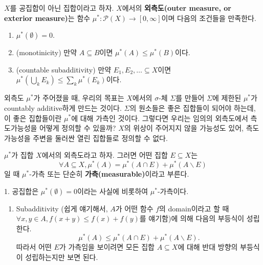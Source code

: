 \documentclass[b5paper,]{scrbook}
\providecommand{\tightlist}{%
  \setlength{\itemsep}{0pt}\setlength{\parskip}{0pt}}
\theoremstyle{plain}
\theoremstyle{definition}
\numberwithin{equation}{section}
\let\BeginKnitrBlock\begin \let\EndKnitrBlock\end
\begin{document}
\BeginKnitrBlock{definition}[외측도]
\protect\hypertarget{def:unnamed-chunk-53}{}{\label{def:unnamed-chunk-53} {} }\(X\)를 공집합이 아닌 집합이라고 하자. \(X\)에서의 \textbf{외측도(outer measure, or exterior measure)}는 함수 \(\mu^{*}:\mathcal{P}(X)\rightarrow [0,\infty]\)이며 다음의 조건들을 만족한다.

\begin{enumerate}
\def\labelenumi{\arabic{enumi}.}
\item
  \(\mu^{*}(\emptyset) = 0.\)
\item
  (monotinicity) 만약 \(A\subseteq B\)이면 \(\mu^{*}(A)\leq \mu^{*}(B)\)이다.
\item
  (countable subadditivity) 만약 \(E_{1},E_{2},\ldots \subseteq X\)이면 \(\mu^{*}(\bigcup_{k}E_{k})\leq \sum_{k}\mu^{*}(E_{k})\)이다.
\end{enumerate}
\EndKnitrBlock{definition}

외측도 \(\mu^{*}\)가 주어졌을 때, 우리의 목표는 \(X\)에서의 \(\sigma\)-체 \(\Sigma\)를 만들어 \(\Sigma\)에 제한된 \(\mu^{*}\)가 countably additive하게 만드는 것이다. \(\Sigma\)의 원소들은 좋은 집합들이 되어야 하는데, 이 좋은 집합들이란 \(\mu^{*}\)에 대해 가측인 것이다. 그렇다면 우리는 임의의 외측도에서 측도가능성을 어떻게 정의할 수 있을까? \(X\)의 위상이 주어지지 않을 가능성도 있어, 측도가능성을 주변을 둘러싼 열린 집합들로 정의할 수 없다.

\BeginKnitrBlock{definition}[가측집합]
\protect\hypertarget{def:unnamed-chunk-54}{}{\label{def:unnamed-chunk-54} {} }\(\mu^{*}\)가 집합 \(X\)에서의 외측도라고 하자. 그러면 어떤 집합 \(E\subseteq X\)는
\[\forall A\subseteq X, \mu^{*}(A)=\mu^{*}(A\cap E) + \mu^{*}(A\backslash E)\]
일 때 \(\mu^{*}\)-가측 또는 단순히 \textbf{가측(measurable)}이라고 부른다.
\EndKnitrBlock{definition}

\BeginKnitrBlock{remark}[외측도의 따름정리]
{}1. 공집합은 \(\mu^{*}(\emptyset)=0\)이라는 사실에 비롯하여 \(\mu^{*}\)-가측이다.

\begin{enumerate}
\def\labelenumi{\arabic{enumi}.}
\setcounter{enumi}{1}
\tightlist
\item
  Subadditivity (쉽게 얘기해서, \(A\)가 어떤 함수 \(f\)의 domain이라고 할 때 \(\forall x,y\in A, f(x+y)\leq f(x)+f(y)\)를 얘기함)에 의해 다음의 부등식이 성립한다.
  \[\mu^{*}(A) \leq \mu^{*}(A\cap E) + \mu^{*}(A\backslash E).\]
  따라서 어떤 \(E\)가 가측임을 보이려면 모든 집합 \(A\subseteq X\)에 대해 반대 방향의 부등식이 성립하는지만 보면 된다.
\end{enumerate}
\EndKnitrBlock{remark}
\end{document}
